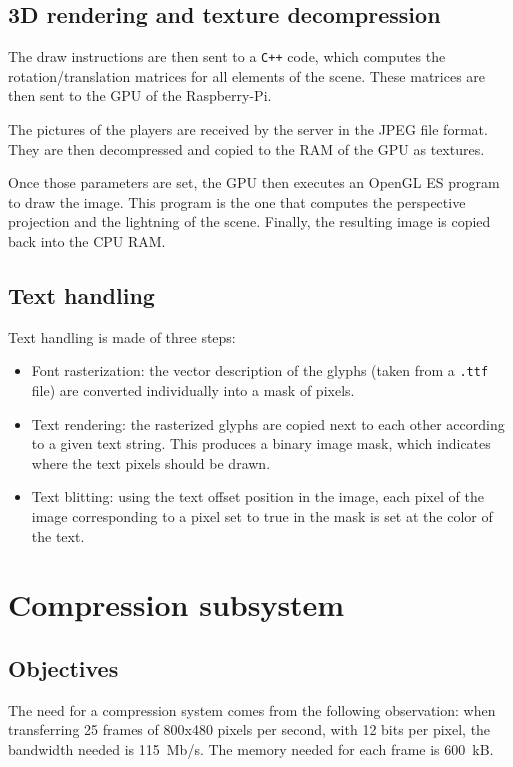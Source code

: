 \documentclass[english, DIV=13]{scrreprt}
\begin{document}
\subsection{3D rendering and texture decompression}

The draw instructions are then sent to a \texttt{C++} code, which computes the
rotation/translation
matrices for all elements of the scene. These matrices are then sent to the GPU of the
Raspberry-Pi.

The pictures of the players are received by the server in the JPEG file format.
They are then decompressed and copied to the RAM of the GPU as textures.

Once those parameters are set, the GPU then executes an OpenGL ES program to draw the
image. This program is the one that computes the perspective projection and the lightning
of the scene.
Finally, the resulting image is copied back into the CPU RAM.

\subsection{Text handling}

Text handling is made of three steps:
\begin{itemize}
    \item Font rasterization: the vector description of the glyphs (taken from a 
    \texttt{.ttf} file) are converted individually into a mask of pixels.
    \item Text rendering: the rasterized glyphs are copied next to each other according
    to a given text string. This produces a binary image mask, which indicates where
    the text pixels should be drawn.
    \item Text blitting: using the text offset position in the image, each pixel of the
    image corresponding to a pixel set to true in the mask is set at the color of the
    text.
\end{itemize}

\section{Compression subsystem}
\label{sec:compression}

\subsection{Objectives}

The need for a compression system comes from the following observation:
when transferring 25 frames of 800x480 pixels per second, with 12 bits per pixel,
the bandwidth needed is \SI{115}{Mb/s}. The memory needed for each frame
is \SI{600}{kB}.
\end{document}

